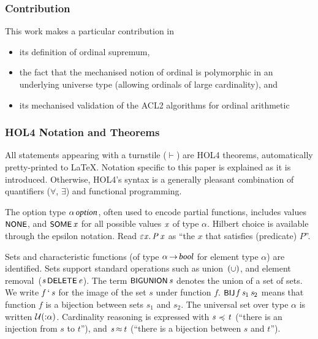 \documentclass[11pt]{llncs}
\renewcommand{\HOLConst}[1]{{\textsf{\upshape\small #1}}}
\renewcommand{\HOLTyOp}[1]{\mbox{\fontencoding{T1}\fontfamily{bch}\fontseries{m}\fontshape{it}\fontsize{9.5}{10}\selectfont #1}}
\renewcommand{\HOLinline}[1]{\ensuremath{#1}}
\begin{document}
\subsubsection{Contribution}

This work makes a particular contribution in
\begin{itemize}
\item its definition of ordinal supremum,
\item the fact that the mechanised notion of ordinal is polymorphic in an underlying universe type (allowing ordinals of large cardinality), and
\item its mechanised validation of the ACL2 algorithms for ordinal arithmetic
\end{itemize}

\subsubsection{HOL4 Notation and Theorems}
All statements appearing with a turnstile ($\vdash$) are HOL4 theorems, automatically pretty-printed to \LaTeX{}.
Notation specific to this paper is explained as it is introduced.
Otherwise, HOL4's syntax is a generally pleasant combination of quantifiers ($\forall$, $\exists$) and functional programming.

The option type \HOLinline{\ensuremath{\alpha}\,\HOLTyOp{option}}, often used to encode partial functions, includes values \HOLinline{\HOLConst{NONE}}, and \HOLinline{\HOLConst{SOME}\,\HOLFreeVar{x}} for all possible values \HOLinline{\HOLFreeVar{x}} of type \HOLinline{\ensuremath{\alpha}}.
Hilbert choice is available through the epsilon notation.
Read \HOLinline{\HOLTokenHilbert{}\HOLBoundVar{x}\ensuremath{.}\,\HOLFreeVar{P}\,\HOLBoundVar{x}} as ``the $x$ that satisfies (predicate) $P$''.

Sets and characteristic functions (of type \HOLinline{\ensuremath{\alpha}\,\ensuremath{{\rightarrow}}\,\HOLTyOp{bool}} for element type \HOLinline{\ensuremath{\alpha}}) are identified.
Sets support standard operations such as union~\HOLinline{(\HOLConst{\HOLTokenUnion{}})}, and element removal~(\HOLinline{\HOLFreeVar{s}\,\HOLConst{DELETE}\,\HOLFreeVar{e}}).
The term \HOLinline{\HOLConst{BIGUNION}\,\HOLFreeVar{s}} denotes the union of a set of sets.
We write \HOLinline{\HOLFreeVar{f}\,\textrm{`}\,\HOLFreeVar{s}} for the image of the set $s$ under function $f$.
\HOLinline{\HOLConst{BIJ}\,\HOLFreeVar{f}\,\HOLFreeVar{s\sb{\mathrm{1}}}\,\HOLFreeVar{s\sb{\mathrm{2}}}} means that function $f$ is a bijection between sets $s_1$ and $s_2$.
The universal set over type \HOLinline{\ensuremath{\alpha}} is written \HOLinline{\ensuremath{\cal{U}}(\ensuremath{{:}}\ensuremath{\alpha})}.
Cardinality reasoning is expressed with \HOLinline{\HOLFreeVar{s}\,\ensuremath{{\,\HOLTokenIsPrefix\,}}\,\HOLFreeVar{t}} (``there is an injection from $s$ to $t$''), and \HOLinline{\HOLFreeVar{s}\,\ensuremath{{\approx}}\,\HOLFreeVar{t}} (``there is a bijection between $s$ and $t$'').
\end{document}
